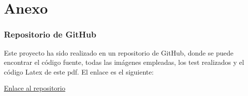 \part{Anexo}
\section{Repositorio de GitHub}
Este proyecto ha sido realizado en un repositorio de GitHub, donde se puede encontrar el código fuente, todas las imágenes empleadas, los test realizados y el código Latex de este pdf. El enlace es el siguiente:

\textcolor{blue}{\href{https://github.com/Juanmaa21/PIV_VisionArtificial}{Enlace al repositorio}}